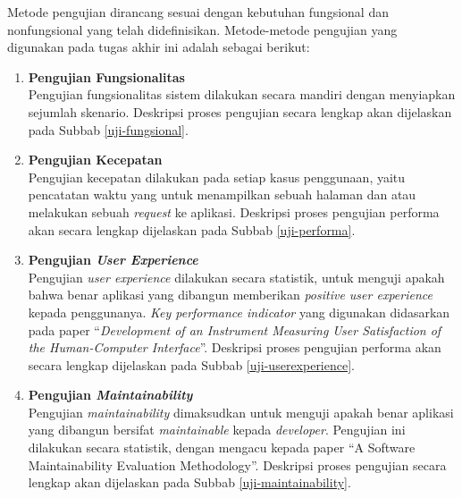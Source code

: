 	
	Metode pengujian dirancang sesuai dengan kebutuhan fungsional dan nonfungsional yang telah didefinisikan. Metode-metode pengujian yang digunakan pada tugas akhir ini adalah sebagai berikut:
	
	\begin{enumerate}
	\item \textbf{Pengujian Fungsionalitas} \\
	Pengujian fungsionalitas sistem dilakukan secara mandiri dengan menyiapkan sejumlah skenario. Deskripsi proses pengujian secara lengkap akan dijelaskan pada Subbab \ref{uji-fungsional}.
	
	\item \textbf{Pengujian Kecepatan}\\
	Pengujian kecepatan dilakukan pada setiap kasus penggunaan, yaitu pencatatan waktu yang untuk menampilkan sebuah halaman dan atau melakukan sebuah \textit{request} ke aplikasi. Deskripsi proses pengujian performa akan secara lengkap dijelaskan pada Subbab \ref{uji-performa}.
	
	\item \textbf{Pengujian \textit{User Experience}} \\
	Pengujian \textit{user experience} dilakukan secara statistik, untuk menguji apakah bahwa benar aplikasi yang dibangun memberikan \textit{positive user experience} kepada penggunanya. \textit{Key performance indicator} yang digunakan didasarkan pada paper ``\textit{Development of an Instrument Measuring User Satisfaction of the Human-Computer Interface}''. Deskripsi proses pengujian performa akan secara lengkap dijelaskan pada Subbab \ref{uji-userexperience}.
	
	\item \textbf{Pengujian \textit{Maintainability}} \\
	Pengujian \textit{maintainability} dimaksudkan untuk menguji apakah benar aplikasi yang dibangun bersifat \textit{maintainable} kepada \textit{developer}. Pengujian ini dilakukan secara statistik, dengan mengacu kepada paper ``A Software Maintainability Evaluation Methodology''. Deskripsi proses pengujian secara lengkap akan dijelaskan pada Subbab \ref{uji-maintainability}.
	\end{enumerate}

